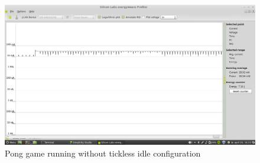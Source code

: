 \begin{figure}[H]
  \centering
  \includegraphics[clip, trim=0cm 0cm 0cm 0cm, width=12cm]{fig/running.png}
  \caption{Pong game running without tickless idle configuration}
\end{figure}
